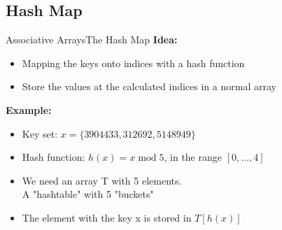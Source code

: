 \subsection{Hash Map}

\begin{frame}{Associative Arrays}{The Hash Map}
  \textbf{Idea:}
  \begin{itemize}
    \item
      Mapping the keys onto indices with a {\color{Mittel-Blau}hash function}
    \item
      Store the values at the calculated indices in a normal array
  \end{itemize}
  \textbf{Example:}
  \begin{itemize}
    \item
      Key set: $x = \{3904433, 312692, 5148949\}$
     \item
      Hash function:
      {\color{Mittel-Blau}$h(x) = x \;\mathrm{mod}\; 5$},
      in the range {\color{Mittel-Blau} $[0, \ldots, 4]$ }
     \item We need an array {\color{Mittel-Blau}T}
      with {\color{Mittel-Blau}5} elements.\\
      A "hashtable" with 5 "buckets"
     \item
      The element with the key {\color{Mittel-Blau}x}
      is stored in {\color{Mittel-Blau}$T[h(x)]$}
  \end{itemize}
\end{frame}


